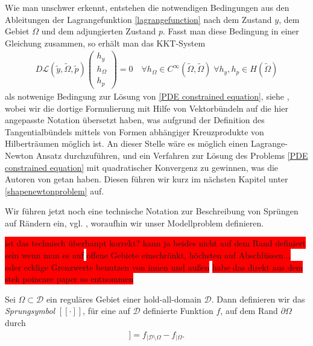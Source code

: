 Wie man unschwer erkennt, entstehen die notwendigen Bedingungen aus den Ableitungen der Lagrangefunktion \ref{lagrangefunction} nach dem Zustand $y$, dem Gebiet $\Omega$ und dem adjungierten Zustand $p$. Fasst man diese Bedingung in einer Gleichung zusammen, so erhält man das KKT-System
\begin{equation}
\label{KKT}
\begin{aligned}
	D\mathcal{L}(\tilde{y},\tilde{\Omega},\tilde{p})\left(
	\begin{matrix}
	h_y \\
	h_{\Omega} \\
	h_p
	\end{matrix}\right)	 = 0 \quad \forall h_{\Omega} \in C^{\infty}(\tilde{\Omega},\tilde{\Omega})\;
	\forall h_y, h_p \in H(\tilde{\Omega})
\end{aligned}
\end{equation}
als notwenige Bedingung zur Lösung von \ref{PDE constrained equation}, siehe \cite{LagrangeNewton}, wobei wir die dortige Formulierung mit Hilfe von Vektorbündeln auf die hier angepasste Notation übersetzt haben, was aufgrund der Definition des Tangentialbündels mittels von Formen abhängiger Kreuzprodukte von Hilberträumen  möglich ist. An dieser Stelle wäre es möglich einen Lagrange-Newton Ansatz durchzuführen, und ein Verfahren zur Lösung des Problems \ref{PDE constrained equation} mit quadratischer Konvergenz zu gewinnen, was die Autoren von \cite{LagrangeNewton} getan haben. Diesen führen wir kurz im nächsten Kapitel unter \ref{shapenewtonproblem} auf.

Wir führen jetzt noch eine technische Notation zur Beschreibung von Sprüngen auf Rändern ein, vgl. \cite{LagrangeNewton}, woraufhin wir unser Modellproblem definieren.

\colorbox{red}{ist das technisch überhaupt korrekt? kann ja beides }\newline
\colorbox{red}{nicht auf dem Rand definiert sein wenn man es auf}\newline
\colorbox{red}{ offene Gebiete einschränkt, höchsten auf Abschlüssen... oder ecklige Grenzwerte benutzen von innen und außen}\newline
\colorbox{red}{habe das direkt aus dem stek poincare paper so entnommen}
\begin{defi}
	Sei $\Omega \subset \mathcal{D}$ ein reguläres Gebiet einer hold-all-domain $\mathcal{D}$. Dann definieren wir das \textit{Sprungsymbol} $[[\cdot]]$, für eine auf $\mathcal{D}$ definierte Funktion $f$, auf dem Rand $\partial\Omega$ durch
	\begin{align*}
		[[f]] = f_{\vert \mathcal{D} \setminus \Omega} - f_{\vert \Omega}.
	\end{align*}
\end{defi}

